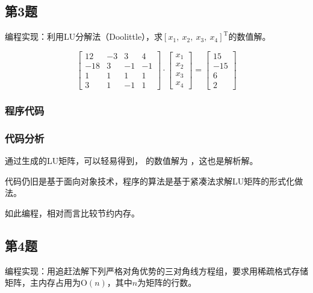 \subsection{第3题}

编程实现：利用LU分解法（Doolittle），求$[x_1,\ x_2,\ x_3,\ x_4]^\mathrm{T}$的数值解。

\begin{equation}
\left[ \begin{array}{rrrr}{12} & {-3} & {3} & {4} \\ {-18} & {3} & {-1} & {-1} \\ {1} & {1} & {1} & {1} \\ {3} & {1} & {-1} & {1}\end{array}\right] \cdot \left[ \begin{array}{c}{x_{1}} \\ {x_{2}} \\ {x_{3}} \\ {x_{4}}\end{array}\right]=\left[ \begin{array}{r}{15} \\ {-15} \\ {6} \\ {2}\end{array}\right]
\end{equation}

\subsubsection{程序代码}


\subsubsection{代码分析}

通过生成的LU矩阵，可以轻易得到， 的数值解为 ，这也是解析解。

代码仍旧是基于面向对象技术，程序的算法是基于紧凑法求解LU矩阵的形式化做法。

如此编程，相对而言比较节约内存。

\subsection{第4题}

编程实现：用追赶法解下列严格对角优势的三对角线方程组，要求用稀疏格式存储矩阵，主内存占用为$\mathrm{O}(n)$，其中$n$为矩阵的行数。

